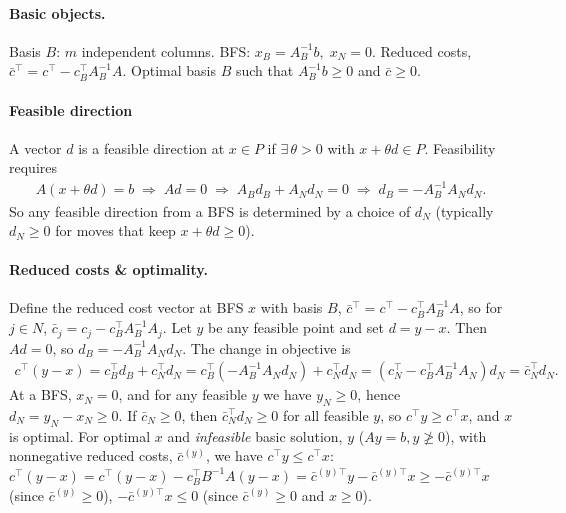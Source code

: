 \documentclass{article}
\begin{document}
\paragraph{Basic objects.} 
Basis $B$: $m$ independent columns.  
BFS: $x_B = A_B^{-1}b,\; x_N=0$.  
Reduced costs, $\bar c^\top = c^\top - c_B^\top A_B^{-1}A$. 
Optimal basis $B$ such that $A_B^{-1}b \ge 0$ and $\bar c \ge 0$.

\paragraph{Feasible direction} 
A vector $d$ is a feasible direction at $x\in P$ if $\exists\,\theta>0$ with $x+\theta d\in P$.
Feasibility requires
\begin{align*}
    A(x+\theta d)=b 
    \;\Longrightarrow\;
    A d = 0
    \;\Longrightarrow\;
    A_B d_B + A_N d_N = 0
    \;\Longrightarrow\;
    d_B = -A_B^{-1}A_N d_N.
\end{align*}
So any feasible direction from a BFS is determined by a choice of $d_N$ (typically $d_N\ge0$ for moves that keep $x+\theta d\ge0$).


\paragraph{Reduced costs \& optimality.}
Define the reduced cost vector at BFS $x$ with basis $B$, $\bar c^\top = c^\top - c_B^\top A_B^{-1}A$, so for $j\in N$, $\bar c_j = c_j - c_B^\top A_B^{-1}A_j$.
Let $y$ be any feasible point and set $d = y - x$.
Then $A d = 0$, so $d_B = -A_B^{-1}A_N d_N$.
The change in objective is
\begin{align*}
    c^\top(y-x) = c_B^\top d_B + c_N^\top d_N 
    = c_B^\top(-A_B^{-1}A_N d_N) + c_N^\top d_N 
    = (c_N^\top - c_B^\top A_B^{-1}A_N)d_N 
    = \bar c_N^\top d_N.
\end{align*}
At a BFS, $x_N = 0$, and for any feasible $y$ we have $y_N\ge0$, hence $d_N = y_N - x_N \ge 0$.
If $\bar c_N \ge 0$, then $\bar c_N^\top d_N \ge 0$ for all feasible $y$, so $c^\top y \ge c^\top x$, and $x$ is optimal.
For optimal $x$ and \emph{infeasible} basic solution, $y$ ($Ay=b, y \not\geq 0$), with nonnegative reduced costs, $\bar c^{(y)}$, we have $c^\top y\leq c^\top x$: $c^\top(y - x) = c^\top(y - x) - c_B^\top B^{-1}A(y-x) = \bar c^{(y)\top} y - \bar c^{(y)\top} x \geq - \bar c^{(y)\top} x$ (since $\bar c^{(y)}\geq 0$), $- \bar c^{(y)\top} x  \leq 0$ (since $\bar c^{(y)}\geq 0$ and $x\geq 0$).
\end{document}
